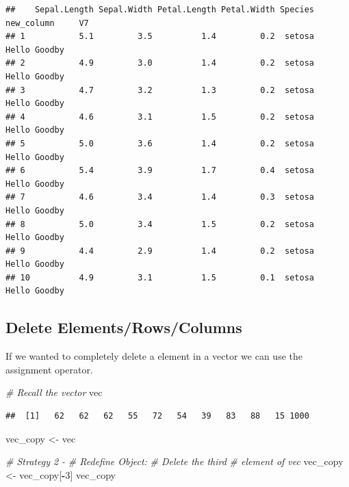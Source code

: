 \documentclass[
]{book}
\newenvironment{Shaded}{\begin{snugshade}}{\end{snugshade}}
\newcommand{\CommentTok}[1]{\textcolor[rgb]{0.56,0.35,0.01}{\textit{#1}}}
\newcommand{\DecValTok}[1]{\textcolor[rgb]{0.00,0.00,0.81}{#1}}
\newcommand{\NormalTok}[1]{#1}
\newcommand{\OperatorTok}[1]{\textcolor[rgb]{0.81,0.36,0.00}{\textbf{#1}}}
\newcommand{\StringTok}[1]{\textcolor[rgb]{0.31,0.60,0.02}{#1}}
\begin{document}
\begin{verbatim}
##    Sepal.Length Sepal.Width Petal.Length Petal.Width Species new_column     V7
## 1           5.1         3.5          1.4         0.2  setosa      Hello Goodby
## 2           4.9         3.0          1.4         0.2  setosa      Hello Goodby
## 3           4.7         3.2          1.3         0.2  setosa      Hello Goodby
## 4           4.6         3.1          1.5         0.2  setosa      Hello Goodby
## 5           5.0         3.6          1.4         0.2  setosa      Hello Goodby
## 6           5.4         3.9          1.7         0.4  setosa      Hello Goodby
## 7           4.6         3.4          1.4         0.3  setosa      Hello Goodby
## 8           5.0         3.4          1.5         0.2  setosa      Hello Goodby
## 9           4.4         2.9          1.4         0.2  setosa      Hello Goodby
## 10          4.9         3.1          1.5         0.1  setosa      Hello Goodby
\end{verbatim}

\hypertarget{delete-elementsrowscolumns}{%
\subsection{Delete Elements/Rows/Columns}\label{delete-elementsrowscolumns}}

If we wanted to completely delete a element in a vector we can use the assignment operator.

\begin{Shaded}
\begin{Highlighting}[]
\CommentTok{# Recall the vector}
\NormalTok{vec}
\end{Highlighting}
\end{Shaded}

\begin{verbatim}
##  [1]   62   62   62   55   72   54   39   83   88   15 1000
\end{verbatim}

\begin{Shaded}
\begin{Highlighting}[]
\NormalTok{vec_copy <-}\StringTok{ }\NormalTok{vec}

\CommentTok{# Strategy 2 -}
\CommentTok{# Redefine Object:}
\CommentTok{# Delete the third}
\CommentTok{# element of vec}
\NormalTok{vec_copy <-}\StringTok{ }\NormalTok{vec_copy[}\OperatorTok{-}\DecValTok{3}\NormalTok{]}
\NormalTok{vec_copy}
\end{Highlighting}
\end{Shaded}
\end{document}
